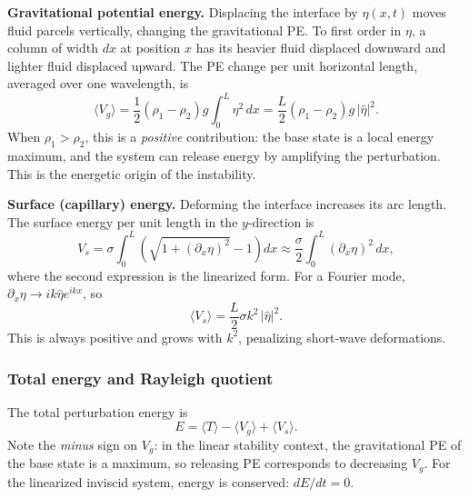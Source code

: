 \documentclass[11pt,a4paper]{article}
\begin{document}
\medskip\noindent
\textbf{Gravitational potential energy.}  Displacing the interface by $\eta(x,t)$ moves fluid parcels vertically, changing the gravitational PE.  To first order in $\eta$, a column of width $dx$ at position $x$ has its heavier fluid displaced downward and lighter fluid displaced upward.  The PE change per unit horizontal length, averaged over one wavelength, is
\begin{equation}
    \langle V_g \rangle
    =
    \frac{1}{2}(\rho_1-\rho_2)g \int_0^L \eta^2\,dx
    =
    \frac{L}{2}(\rho_1-\rho_2)g\,|\widehat{\eta}|^2.
    \label{eq:gravitational_pe}
\end{equation}
When $\rho_1>\rho_2$, this is a \emph{positive} contribution: the base state is a local energy maximum, and the system can release energy by amplifying the perturbation.  This is the energetic origin of the instability.

\medskip\noindent
\textbf{Surface (capillary) energy.}  Deforming the interface increases its arc length.  The surface energy per unit length in the $y$-direction is
\begin{equation}
    V_s
    =
    \sigma\int_0^L
    \left(\sqrt{1+(\partial_x\eta)^2}-1\right)dx
    \approx
    \frac{\sigma}{2}\int_0^L (\partial_x\eta)^2\,dx,
\end{equation}
where the second expression is the linearized form.  For a Fourier mode, $\partial_x\eta \to ik\widehat{\eta}e^{ikx}$, so
\begin{equation}
    \langle V_s \rangle
    =
    \frac{L}{2}\sigma k^2\,|\widehat{\eta}|^2.
    \label{eq:surface_energy}
\end{equation}
This is always positive and grows with $k^2$, penalizing short-wave deformations.

\subsubsection{Total energy and Rayleigh quotient}

The total perturbation energy is
\begin{equation}
    E = \langle T \rangle - \langle V_g \rangle + \langle V_s \rangle.
    \label{eq:total_energy}
\end{equation}
Note the \emph{minus} sign on $V_g$: in the linear stability context, the gravitational PE of the base state is a maximum, so releasing PE corresponds to decreasing $V_g$.  For the linearized inviscid system, energy is conserved: $dE/dt=0$.
\end{document}

